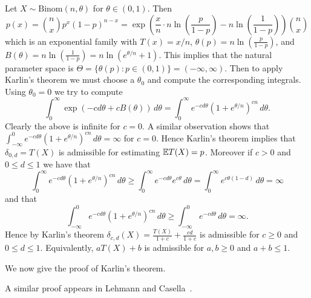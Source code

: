 \begin{example}
	Let $X \sim \text{Binom}(n, \theta)$ for $\theta \in (0, 1)$. Then \[
		p(x) = \binom{n}{x} p^x (1-p)^{n-x} = \exp\left(\frac{x}{n} \cdot n \ln\left(\frac{p}{1-p}\right) - n\ln\left(\frac{1}{1-p}\right)\right) \binom{n}{x}
	\] which is an exponential family with $T(x) = x/n$, $\theta(p) = n\ln\left(\frac{p}{1-p}\right) $, and $B(\theta) = n\ln\left(\frac{1}{1-p}\right) = n\ln(e^{\theta/n}+1)$. This implies that the natural parameter space is $\Theta = \{ \theta(p) : p \in (0, 1)\} = (-\infty, \infty)$. Then to apply Karlin's theorem we must choose a $\theta_0$ and compute the corresponding integrals. Using $\theta_0 = 0$ we try to compute \[
		\int_{0}^{\infty} \exp({-cd\theta + cB(\theta)}) \, d\theta  =
		\int_{0}^{\infty} e^{-cd\theta} (1 + e^{\theta/n})^{cn} \, d\theta.
	\] Clearly the above is infinite for $c = 0$. A similar observation shows that $\int_{-\infty}^{0} e^{-cd\theta} (1 + e^{\theta/n})^{cn} \, d\theta = \infty$ for $c = 0$. Hence Karlin's theorem implies that $\delta_{0,d} = T(X)$ is admissible for estimating $\mathbb{E} T(X) = p$. Moreover if $c > 0$ and $0 \le d \le 1$ we have that \[
	\int_{0}^{\infty} e^{-cd\theta} (1 + e^{\theta/n})^{cn} \, d\theta \ge \int_{0}^{\infty} e^{-cd\theta} e^{c\theta} \, d\theta = \int_{0}^{\infty} e^{c\theta(1 - d)} \, d\theta = \infty
	\] and that \[
		\int_{-\infty}^0 e^{-cd\theta} (1 + e^{\theta/n})^{cn} \, d\theta \ge \int_{-\infty}^0 e^{-cd\theta} \, d\theta = \infty.
	\] Hence by Karlin's theorem $\delta_{c,d}(X) = \frac{T(X)}{1+c} + \frac{cd}{1+c}$ is admissible for $c \ge 0$ and $0 \le d \le 1$. Equivalently, $a T(X) + b$ is admissible for $a,b \ge 0$ and $a + b \leq 1$. 
\end{example}

\noindent We now give the proof of Karlin's theorem.

\medskip \noindent A similar proof appears in Lehmann and Casella~\cite[Theorem 5.2.14, pp.~331--333]{LehmannCasella1998}.

